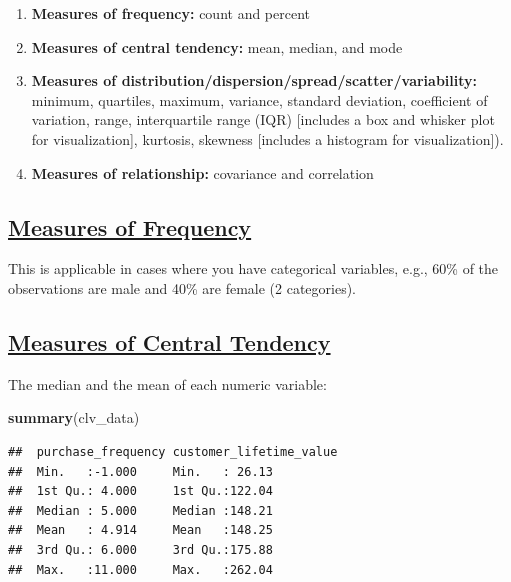 \documentclass[
]{article}
\newenvironment{Shaded}{\begin{snugshade}}{\end{snugshade}}
\newcommand{\FunctionTok}[1]{\textcolor[rgb]{0.13,0.29,0.53}{\textbf{#1}}}
\newcommand{\NormalTok}[1]{#1}
\begin{document}
\begin{enumerate}
\def\labelenumi{\arabic{enumi}.}
\item
  \textbf{Measures of frequency:} count and percent
\item
  \textbf{Measures of central tendency:} mean, median, and mode
\item
  \textbf{Measures of
  distribution/dispersion/spread/scatter/variability:} minimum,
  quartiles, maximum, variance, standard deviation, coefficient of
  variation, range, interquartile range (IQR) {[}includes a box and
  whisker plot for visualization{]}, kurtosis, skewness {[}includes a
  histogram for visualization{]}).
\item
  \textbf{Measures of relationship:} covariance and correlation
\end{enumerate}

\subsection{\texorpdfstring{\ul{\textbf{Measures of
Frequency}}}{Measures of Frequency}}\label{measures-of-frequency}

This is applicable in cases where you have categorical variables, e.g.,
60\% of the observations are male and 40\% are female (2 categories).

\subsection{\texorpdfstring{\ul{\textbf{Measures of Central
Tendency}}}{Measures of Central Tendency}}\label{measures-of-central-tendency}

The median and the mean of each numeric variable:

\begin{Shaded}
\begin{Highlighting}[]
\FunctionTok{summary}\NormalTok{(clv\_data)}
\end{Highlighting}
\end{Shaded}

\begin{verbatim}
##  purchase_frequency customer_lifetime_value
##  Min.   :-1.000     Min.   : 26.13         
##  1st Qu.: 4.000     1st Qu.:122.04         
##  Median : 5.000     Median :148.21         
##  Mean   : 4.914     Mean   :148.25         
##  3rd Qu.: 6.000     3rd Qu.:175.88         
##  Max.   :11.000     Max.   :262.04
\end{verbatim}
\end{document}
